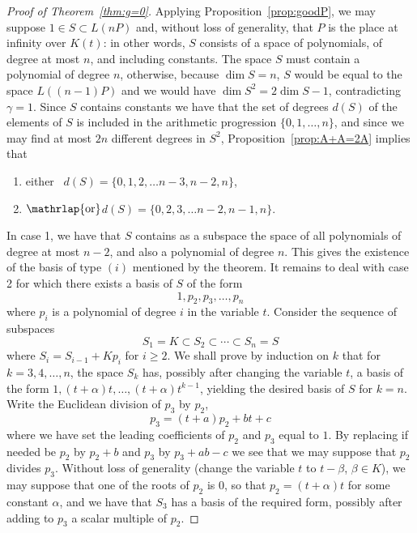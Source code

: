 \documentclass[ALCO,Unicode,ThmDefs]{cedram}
\renewcommand{\geq}{\geqslant}
\begin{document}
\begin{proof}[Proof of Theorem~\ref{thm:g=0}]
Applying Proposition~\ref{prop:goodP}, we may suppose $1\in S\subset L(nP)$ and, without loss of generality, that $P$ is the place at infinity over $K(t)$: in other words, $S$ consists of a space of polynomials, of degree at most $n$, and including constants. The space $S$ must contain a polynomial of degree $n$, otherwise, because $\dim S=n$, $S$ would be equal to the space $L((n-1)P)$ and we would have $\dim S^2=2\dim S-1$, contradicting $\gamma=1$. Since $S$ contains constants we have that the set of degrees $d(S)$ of the elements of $S$ is included in the arithmetic progression $\{0,1,\ldots,n\}$, and since we may find at most $2n$ different degrees in $S^2$, Proposition~\ref{prop:A+A=2A} implies that
\begin{enumerate}
\item either \ $d(S)=\{0,1,2,\ldots n-3,n-2,n\}$,
\item $\mathrlap{\text{or}}$\phantom{either \ }$d(S)=\{0,2,3,\ldots n-2,n-1,n\}$.
\end{enumerate}
In case 1, we have that $S$ contains as a subspace the space of all polynomials of degree at most $n-2$, and also a polynomial of degree $n$. This gives the existence of the basis of type $(i)$ mentioned by the theorem. It remains to deal with case 2 for which there exists a basis of $S$ of the form
\[
1,p_2,p_3,\ldots,p_n
\]
where $p_i$ is a polynomial of degree $i$ in the variable $t$. Consider the sequence of subspaces
\[
S_1=K\subset S_2\subset\cdots
\subset S_n=S
\]
where $S_i= S_{i-1}+Kp_i$ for $i\geq2$. We shall prove by induction on $k$ that for $k=3,4,\ldots,n$, the space $S_k$ has, possibly after changing the variable $t$, a basis of the form $1,(t+\alpha)t,\ldots, (t+\alpha)t^{k-1}$, yielding the desired basis of $S$ for $k=n$. Write the Euclidean division of $p_3$ by $p_2$,
\[
p_3=(t+a)p_2 + bt+c
\]
where we have set the leading coefficients of $p_2$ and $p_3$ equal to $1$. By replacing if needed be $p_2$ by $p_2+b$ and $p_3$ by $p_3+ab-c$ we see that we may suppose that $p_2$ divides $p_3$. Without loss of generality (change the variable $t$ to $t-\beta$, $\beta\in K$), we may suppose that one of the roots of $p_2$ is $0$, so that $p_2=(t+\alpha)t$ for some constant $\alpha$, and we have that $S_3$ has a basis of the required form, possibly after adding to $p_3$ a scalar multiple of $p_2$.


\end{proof}
\end{document}
